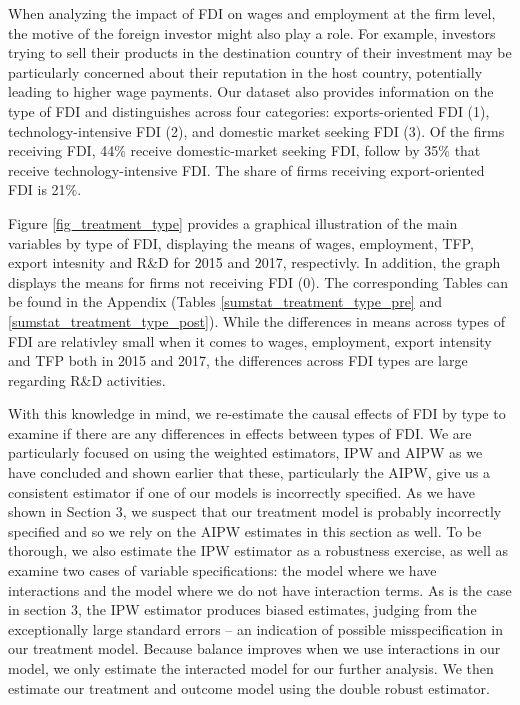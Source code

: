 When analyzing the impact of FDI on wages and employment at the firm level, the  motive of the foreign investor might also play a role. For example, investors trying to sell their products in the destination country of their investment  may be particularly concerned about their reputation in the host country, potentially leading to higher wage payments. Our dataset also provides information on the type of FDI and distinguishes across four categories: exports-oriented FDI (1),  technology-intensive FDI (2), and domestic market seeking FDI (3). Of the firms receiving FDI, 44\% receive domestic-market seeking FDI, follow by 35\% that receive technology-intensive FDI. The share of firms receiving export-oriented FDI is 21\%. \\ \par

Figure \ref{fig_treatment_type} provides a graphical illustration of the main variables by type of FDI, displaying the means of wages, employment, TFP, export intesnity and R\&D for 2015 and 2017, respectivly. In addition, the graph displays the means for firms not receiving FDI (0). The corresponding Tables can be found in the Appendix (Tables \ref{sumstat_treatment_type_pre} and \ref{sumstat_treatment_type_post}). While the differences in means across types of FDI are relativley small when it comes to wages, employment, export intensity and TFP both in 2015 and 2017, the differences across FDI types are large regarding R\&D activities.\\ \par

With this knowledge in mind, we re-estimate the causal effects of FDI by type to examine if there are any differences in effects between types of FDI. We are particularly focused on using the weighted estimators, IPW and AIPW as we have concluded and shown earlier that these, particularly the AIPW, give us a consistent estimator if one of our models is incorrectly specified. As we have shown in Section 3, we suspect that our treatment model is probably incorrectly specified and so we rely on the AIPW estimates in this section as well. To be thorough, we also estimate the IPW estimator as a robustness exercise, as well as examine two cases of variable specifications: the model where we have interactions and the model where we do not have interaction terms. As is the case in section 3, the IPW estimator produces biased estimates, judging from the exceptionally large standard errors – an indication of possible misspecification in our treatment model. Because balance improves when we use interactions in our model, we only estimate the interacted model for our further analysis. We then estimate our treatment and outcome model using the double robust estimator. 

